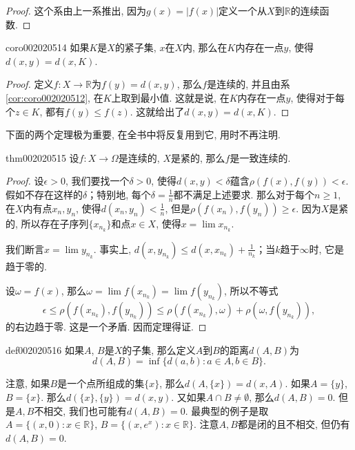 \begin{proof}
这个系由上一系推出, 因为$g(x)=|f(x)|$定义一个从$X$到$\mathbb{R}$的连续函数. 
\end{proof}

\begin{corollary}{}{coro002020514}
如果$K$是$X$的紧子集, $x$在$X$内, 那么在$K$内存在一点$y$, 使得$d(x, y) = d(x, K)$. 
\end{corollary}

\begin{proof}
定义$f: X \to \mathbb{R}$为$f(y) = d(x, y)$, 那么$f$是连续的, 并且由系\ref{cor:coro002020512}, 在$K$上取到最小值. 这就是说, 在$K$内存在一点$y$, 使得对于每个$z \in K$, 都有$f(y) \le f(z)$. 这就给出了$d(x, y) = d(x, K)$. 
\end{proof}

下面的两个定理极为重要, 在全书中将反复用到它, 用时不再注明. 

\begin{theorem}{}{thm002020515}
设$f:X \to \Omega$是连续的, $X$是紧的, 那么$f$是一致连续的. 
\end{theorem}

\begin{proof}
设$\epsilon > 0$, 我们要找一个$\delta > 0$, 使得$d(x, y) < \delta$蕴含$\rho(f(x), f(y)) < \epsilon$. 假如不存在这样的$\delta$；特别地, 每个$\delta = \frac{1}{n}$都不满足上述要求. 那么对于每个$n \ge 1$, 在$X$内有点$x_n, y_n$, 使得$d(x_n, y_n) < \frac{1}{n}$, 但是$\rho(f(x_n), f(y_n)) \ge \epsilon$. 因为$X$是紧的, 所以存在子序列$\{x_{n_k}\}$和点$x \in X$, 使得$x = \lim{x_{n_k}}$. 

我们断言$x = \lim{y_{n_k}}$. 事实上, $d(x, y_{n_k}) \le d(x, x_{n_k}) + \frac{1}{n_k}$；当$k$趋于$\infty$时, 它是趋于零的. 

设$\omega = f(x)$, 那么$\omega = \lim{f(x_{n_k})} = \lim{f(y_{n_k})}$, 所以不等式
\[
\epsilon \le \rho(f(x_{n_k}), f(y_{n_k})) \le \rho(f(x_{n_k}), \omega) + \rho(\omega, f(y_{n_k})),
\]
的右边趋于零. 这是一个矛盾. 因而定理得证. 
\end{proof}

\begin{definition}{}{def002020516}
如果$A$, $B$是$X$的子集, 那么定义$A$到$B$的距离$d(A, B)$为
\[
d(A, B) = \inf\{d(a, b): a \in A, b \in B\}.
\]
\end{definition}

注意, 如果$B$是一个点所组成的集$\{x\}$, 那么$d(A, \{x\}) = d(x, A)$. 如果$A = \{y\}$, $B = \{x\}$. 那么$d(\{x\}, \{y\}) = d(x, y)$. 又如果$A \cap B \neq \emptyset$, 那么$d(A, B) = 0$. 但是$A, B$不相交, 我们也可能有$d(A, B) = 0$. 最典型的例子是取$A = \{(x, 0): x \in \mathbb{R}\}$, $B = \{(x, e^x): x \in \mathbb{R}\}$. 注意$A, B$都是闭的且不相交, 但仍有$d(A, B) = 0$. 

